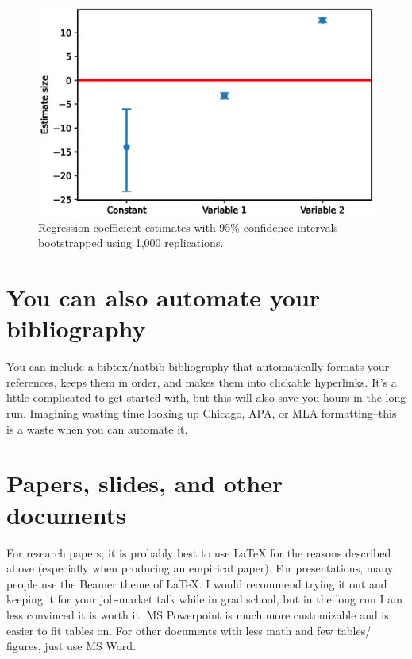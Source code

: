 \documentclass{article}
\begin{document}
\begin{figure}[ht]
    \centering
    \includegraphics[scale = 0.7]{samplebars.eps}
    \caption{Regression coefficient estimates with 95\% confidence intervals bootstrapped using 1,000 replications.}
    \label{fig:samplebars}
\end{figure}

\section{You can also automate your bibliography}

You can include a bibtex/natbib bibliography that automatically formats your references, keeps them in order, and makes them into clickable hyperlinks. It's a little complicated to get started with, but this will also save you hours in the long run.  Imagining wasting time looking up Chicago, APA, or MLA formatting--this is a waste when you can automate it.

\section{Papers, slides, and other documents}
For research papers, it is probably best to use LaTeX for the reasons described above (especially when producing an empirical paper).  For presentations, many people use the Beamer theme of LaTeX.  I would recommend trying it out and keeping it for your job-market talk while in grad school, but in the long run I am less convinced it is worth it.  MS Powerpoint is much more customizable and is easier to fit tables on.  For other documents with less math and few tables/ figures, just use MS Word.



\end{document}
